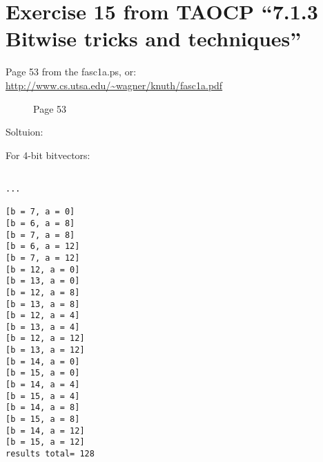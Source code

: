 \section{Exercise 15 from TAOCP ``7.1.3 Bitwise tricks and techniques''}

\renewcommand{\CURPATH}{equations/TAOCP_7_1_3_exercise_15}

Page 53 from the fasc1a.ps, or: \url{http://www.cs.utsa.edu/~wagner/knuth/fasc1a.pdf}

\begin{figure}[H]
\centering
{}
\caption{Page 53}
\end{figure}

Soltuion:



For 4-bit bitvectors:

\begin{lstlisting}

...

[b = 7, a = 0]
[b = 6, a = 8]
[b = 7, a = 8]
[b = 6, a = 12]
[b = 7, a = 12]
[b = 12, a = 0]
[b = 13, a = 0]
[b = 12, a = 8]
[b = 13, a = 8]
[b = 12, a = 4]
[b = 13, a = 4]
[b = 12, a = 12]
[b = 13, a = 12]
[b = 14, a = 0]
[b = 15, a = 0]
[b = 14, a = 4]
[b = 15, a = 4]
[b = 14, a = 8]
[b = 15, a = 8]
[b = 14, a = 12]
[b = 15, a = 12]
results total= 128
\end{lstlisting}

